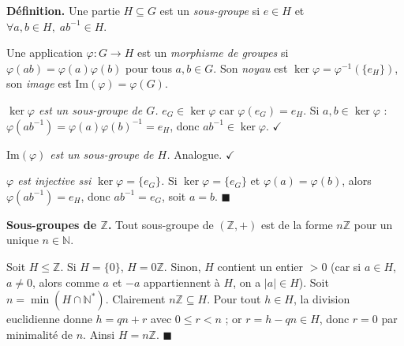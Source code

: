 \decsep{}


\begin{tcolorbox}[thmbox]
  \textbf{Définition.}\enspace%
  Une partie $H \subseteq G$ est un \emph{sous-groupe} si
  $e \in H$ et $\forall a,b \in H,\; ab^{-1} \in H$.

  \medskip
  Une application $\varphi : G \to H$ est un \emph{morphisme de groupes} si
  $\varphi(ab) = \varphi(a)\varphi(b)$ pour tous $a,b \in G$.
  Son \emph{noyau} est $\ker\varphi = \varphi^{-1}(\{e_H\})$,
  son \emph{image} est $\mathrm{Im}(\varphi) = \varphi(G)$.
\end{tcolorbox}

\begin{mdframed}[style=proofbar]
  \textit{$\ker\varphi$ est un sous-groupe de $G$.}
  $e_G \in \ker\varphi$ car $\varphi(e_G) = e_H$.
  Si $a,b \in \ker\varphi$ : $\varphi(ab^{-1}) = \varphi(a)\varphi(b)^{-1} = e_H$,
  donc $ab^{-1} \in \ker\varphi$. $\checkmark$

  \textit{$\mathrm{Im}(\varphi)$ est un sous-groupe de $H$.} Analogue. $\checkmark$

  \textit{$\varphi$ est injective ssi $\ker\varphi = \{e_G\}$.}
  Si $\ker\varphi = \{e_G\}$ et $\varphi(a)=\varphi(b)$, alors
  $\varphi(ab^{-1}) = e_H$, donc $ab^{-1} = e_G$, soit $a = b$.
  \hfill$\blacksquare$
\end{mdframed}

\begin{tcolorbox}[thmbox]
  \textbf{Sous-groupes de $\mathbb{Z}$.}\enspace%
  Tout sous-groupe de $(\mathbb{Z},+)$ est de la forme $n\mathbb{Z}$
  pour un unique $n \in \mathbb{N}$.
\end{tcolorbox}

\begin{mdframed}[style=proofbar]
  Soit $H \leq \mathbb{Z}$. Si $H = \{0\}$, $H = 0\mathbb{Z}$. Sinon,
  $H$ contient un entier $> 0$ (car si $a \in H$, $a\neq 0$, alors comme $a$ et $-a$ appartiennent à $H$, on a $|a|\in H$).
  Soit $n = \min(H \cap \mathbb{N}^*)$. Clairement $n\mathbb{Z} \subseteq H$.
  Pour tout $h \in H$, la division euclidienne donne $h = qn + r$ avec $0 \leq r < n$ ;
  or $r = h - qn \in H$, donc $r = 0$ par minimalité de $n$. Ainsi $H = n\mathbb{Z}$.
  \hfill$\blacksquare$
\end{mdframed}

